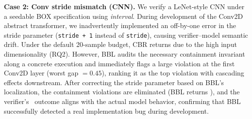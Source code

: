 \textbf{Case 2: Conv stride mismatch (CNN).}
We verify a LeNet-style CNN under a seedable \textsf{BOX} specification using \textit{interval}. During development of the Conv2D abstract transformer, we inadvertently implemented an off-by-one error in the stride parameter (\texttt{stride + 1} instead of \texttt{stride}), causing verifier--model semantic drift. Under the default 20-sample budget, CBR returns \Inconclusive due to the high input dimensionality (RQ2). However, BBL audits the necessary containment invariant along a concrete execution and immediately flags a large violation at the first Conv2D layer (worst gap $=0.45$), ranking it as the top violation with cascading effects downstream. After correcting the stride parameter based on BBL's localization, the containment violations are eliminated (BBL returns \Pass), and the verifier's \Certified\ outcome aligns with the actual model behavior, confirming that BBL successfully detected a real implementation bug during development.

